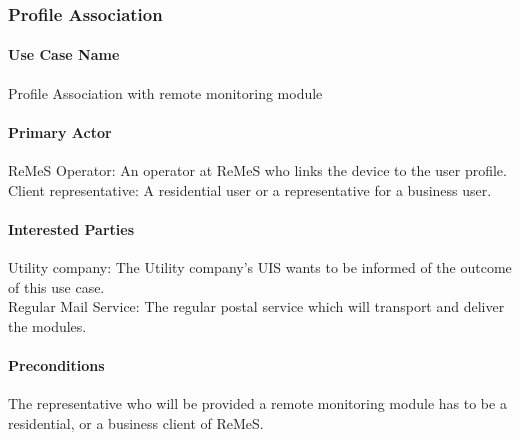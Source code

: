 \subsubsection{Profile Association}

\paragraph{Use Case Name}
Profile Association with remote monitoring module
\paragraph{Primary Actor}
ReMeS Operator: An operator at ReMeS who links the device to the user profile.\\
Client representative: A residential user or a representative for a business user.
\paragraph{Interested Parties}
Utility company: The Utility company's UIS wants to be informed of the outcome of this use case.\\
Regular Mail Service: The regular postal service which will transport and deliver the modules.
\paragraph{Preconditions}
The representative who will be provided a remote monitoring module has to be a residential,
 or a business client of ReMeS.
